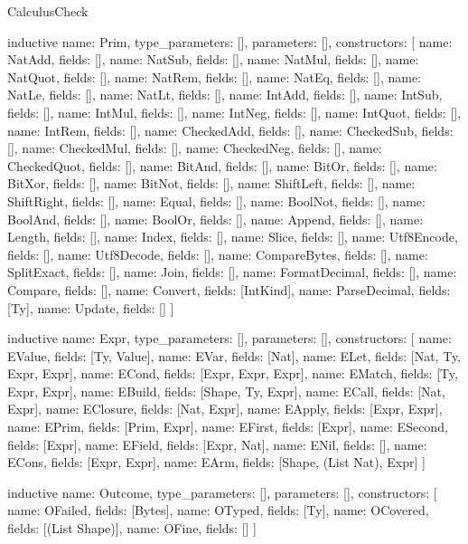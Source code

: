 \begin{lexlean}{CalculusCheck}
\begin{semanticmodule}
inductive{
  name: Prim,
  type_parameters: [],
  parameters: [],
  constructors: [
    {name: NatAdd, fields: []},
    {name: NatSub, fields: []},
    {name: NatMul, fields: []},
    {name: NatQuot, fields: []},
    {name: NatRem, fields: []},
    {name: NatEq, fields: []},
    {name: NatLe, fields: []},
    {name: NatLt, fields: []},
    {name: IntAdd, fields: []},
    {name: IntSub, fields: []},
    {name: IntMul, fields: []},
    {name: IntNeg, fields: []},
    {name: IntQuot, fields: []},
    {name: IntRem, fields: []},
    {name: CheckedAdd, fields: []},
    {name: CheckedSub, fields: []},
    {name: CheckedMul, fields: []},
    {name: CheckedNeg, fields: []},
    {name: CheckedQuot, fields: []},
    {name: BitAnd, fields: []},
    {name: BitOr, fields: []},
    {name: BitXor, fields: []},
    {name: BitNot, fields: []},
    {name: ShiftLeft, fields: []},
    {name: ShiftRight, fields: []},
    {name: Equal, fields: []},
    {name: BoolNot, fields: []},
    {name: BoolAnd, fields: []},
    {name: BoolOr, fields: []},
    {name: Append, fields: []},
    {name: Length, fields: []},
    {name: Index, fields: []},
    {name: Slice, fields: []},
    {name: Utf8Encode, fields: []},
    {name: Utf8Decode, fields: []},
    {name: CompareBytes, fields: []},
    {name: SplitExact, fields: []},
    {name: Join, fields: []},
    {name: FormatDecimal, fields: []},
    {name: Compare, fields: []},
    {name: Convert, fields: [IntKind]},
    {name: ParseDecimal, fields: [Ty]},
    {name: Update, fields: []}
  ]
}

inductive{
  name: Expr,
  type_parameters: [],
  parameters: [],
  constructors: [
    {name: EValue, fields: [Ty, Value]},
    {name: EVar, fields: [Nat]},
    {name: ELet, fields: [Nat, Ty, Expr, Expr]},
    {name: ECond, fields: [Expr, Expr, Expr]},
    {name: EMatch, fields: [Ty, Expr, Expr]},
    {name: EBuild, fields: [Shape, Ty, Expr]},
    {name: ECall, fields: [Nat, Expr]},
    {name: EClosure, fields: [Nat, Expr]},
    {name: EApply, fields: [Expr, Expr]},
    {name: EPrim, fields: [Prim, Expr]},
    {name: EFirst, fields: [Expr]},
    {name: ESecond, fields: [Expr]},
    {name: EField, fields: [Expr, Nat]},
    {name: ENil, fields: []},
    {name: ECons, fields: [Expr, Expr]},
    {name: EArm, fields: [Shape, (List Nat), Expr]}
  ]
}

inductive{
  name: Outcome,
  type_parameters: [],
  parameters: [],
  constructors: [
    {name: OFailed, fields: [Bytes]},
    {name: OTyped, fields: [Ty]},
    {name: OCovered, fields: [(List Shape)]},
    {name: OFine, fields: []}
  ]
}


\end{semanticmodule}
\end{lexlean}
